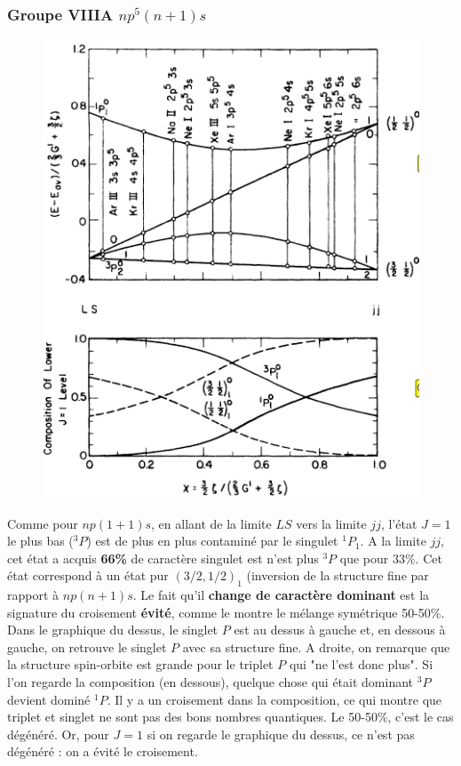 
\subsubsection{Groupe VIIIA $np^5(n+1)s$}
	\begin{figure}
	\vspace{-5mm}
	\includegraphics[scale=0.5]{ch1/image10}
	\end{figure}
Comme pour $np(1+1)s$, en allant de la limite $LS$ vers la limite $jj$, l'état $J=1$ le
plus bas ($^3P$) est de plus en plus contaminé par le singulet $^1P_1$. A la limite 
$jj$, cet état a acquis \textbf{66\%} de caractère singulet est n'est plus $^3P$ que 
pour 33\%. Cet état correspond à un état pur $(3/2,1/2)_1$ (inversion de la structure
fine par rapport à $np(n+1)s$. Le fait qu'il \textbf{change de caractère dominant} est
la signature du croisement \textbf{évité}, comme le montre le mélange symétrique 50-50\%.\\

Dans le graphique du dessus, le singlet $P$ est au dessus à gauche et, en dessous à gauche,
on retrouve le singlet $P$ avec sa structure fine. A droite, on remarque que la structure
spin-orbite est grande pour le triplet $P$ qui "ne l'est donc plus". Si l'on regarde la 
composition (en dessous), quelque chose qui était dominant $^3P$ devient dominé $^1P$. 
Il y a un croisement dans la composition, ce qui montre que triplet et singlet ne sont pas des
bons nombres quantiques. Le 50-50\%, c'est le cas dégénéré. Or, pour $J=1$ si on regarde
le graphique du dessus, ce n'est pas dégénéré : on a évité le croisement.\\

